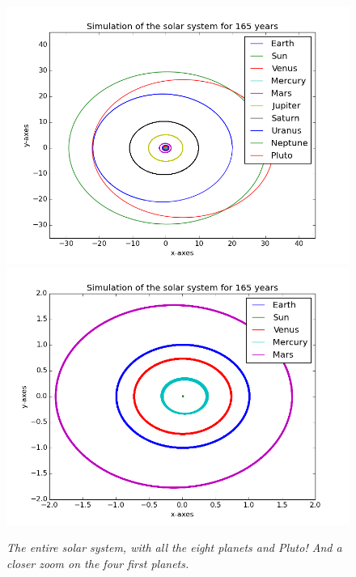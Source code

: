 \documentclass[a4paper,12pt, english]{article}
\begin{document}
\begin{figure}[h!]
  \centering
   	 \includegraphics[scale=0.4]{Solar_system.png}\includegraphics[scale=0.4]{Solar_system_4planets.png}
  \caption{\textit{The entire solar system, with all the eight planets and Pluto! And a closer zoom on the four first planets.}}
\end{figure}
\end{document}
